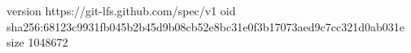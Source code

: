 version https://git-lfs.github.com/spec/v1
oid sha256:68123c9931fb045b2b45d9b08cb52e8bc31e0f3b17073aed9c7cc321d0ab031e
size 1048672
